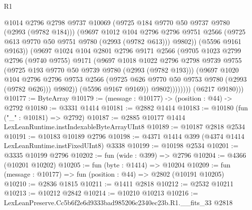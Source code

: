 \begin{lexlean}{R1}
\begin{coremodule}
                          @1014
                          @2796
                          @2798
                          @9737
                          @10069
                          (@9725 @184 @9770 @50 @9737 @9780 (@2993 (@9782 @184)))
                          (@9697
                            @1012
                            @104
                            @2796
                            @2796
                            @9751
                            @2566
                            (@9725 @613 @9770 @50 @9751 @9780 (@2993 (@9782 @613)))
                            @9802))
                        (@5596 @9161 @9163))
                      (@9697
                        @1024
                        @104
                        @2801
                        @2796
                        @9171
                        @2566
                        (@9705
                          @1023
                          @2799
                          @2796
                          (@9740 @9755)
                          @9171
                          (@9697
                            @1018
                            @1022
                            @2796
                            @2798
                            @9739
                            @9755
                            (@9725 @193 @9770 @50 @9739 @9780 (@2993 (@9782 @193)))
                            (@9697
                              @1020
                              @104
                              @2796
                              @2796
                              @9753
                              @2566
                              (@9725 @626 @9770 @50 @9753 @9780 (@2993 (@9782 @626)))
                              @9802))
                          (@5596 @9167 @9169))
                        @9802))))))))
        (@6217 @9180)))
@10177 := ByteArray
@10179 := (message : @10177) -> (position : @44) -> @2792
@10180 := @3331 @1414
@10181 := @2882 @1414
@10183 := @10180 (fun ("_" : @10181) => @2792)
@10187 := @2885 @10177 @1414 LexLeanRuntime.instIndexableByteArrayUInt8
@10189 := @10187 @2818 @2534
@10191 := @10183 @10189 @2796
@10198 := @4371 @1414 @399 (@4374 @1414 LexLeanRuntime.instFixedUInt8) @3338
@10199 := @10198 @2534
@10201 := @3335 @10199 @2796
@10202 := fun (wide : @399) => @2796
@10204 := @4366 (@10201 @10202)
@10205 := fun (byte : @1414) => @10204
@10209 := fun (message : @10177) => fun (position : @44) => @2802 (@10191 @10205)
@10210 := @2836 @1815
@10211 := @1411 @2818
@10212 := @2532 @10211
@10213 := @10212 @2842
@10214 := @10210 @10213
@10216 := LexLeanPreserve.Cc5b6f2e6d9333bad985206c2340ec23b.R1.__fits_33 @2818

\end{coremodule}
\end{lexlean}
